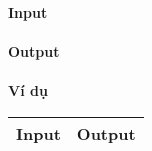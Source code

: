 

\textbf{Input}
\\

\\

\textbf{Output}
\\

\\

\textbf{Ví dụ}
\begin{table}[h!]
    \begin{center}
        \begin{tabular}{|p{6cm}|p{6cm}|}
            \hline
            \textbf{Input} & \textbf{Output} \\ 
            \hline

            \hline
        \end{tabular}
    \end{center}
\end{table}


